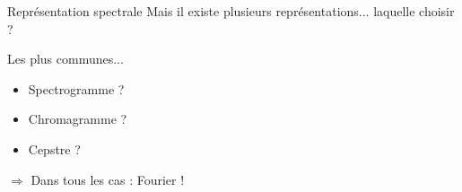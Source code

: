 \documentclass[compress,xcolor=table]{beamer}
\begin{document}


\begin{frame}{Représentation spectrale}
    Mais il existe plusieurs représentations... laquelle choisir ?

    \begin{exampleblock}{Les plus communes...}
        \begin{itemize}
            \item Spectrogramme ?
            \item Chromagramme ?
            \item Cepstre ?
        \end{itemize}
    \end{exampleblock}

    $\Rightarrow$ Dans tous les cas : Fourier !
\end{frame}




\end{document}
